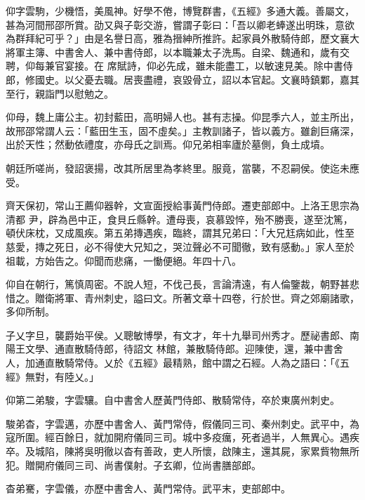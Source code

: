 \begin{pinyinscope}
 仰字雲駒，少機悟，美風神。好學不倦，博覽群書，《五經》多通大義。善屬文，甚為河間邢邵所賞。劭又與子彰交游，嘗謂子彰曰：「吾以卿老蜯遂出明珠，意欲為群拜紀可乎？」由是名譽日高，雅為搢紳所推許。起家員外散騎侍郎，歷文襄大將軍主簿、中書舍人、兼中書侍郎，以本職兼太子洗馬。自梁、魏通和，歲有交聘，仰每兼官宴接。在
 席賦詩，仰必先成，雖未能盡工，以敏速見美。除中書侍郎，修國史。以父憂去職。居喪盡禮，哀毀骨立，詔以本官起。文襄時鎮鄴，嘉其至行，親詣門以慰勉之。



 仰母，魏上庸公主。初封藍田，高明婦人也。甚有志操。仰昆季六人，並主所出，故邢邵常謂人云：「藍田生玉，固不虛矣。」主教訓諸子，皆以義方。雖創巨痛深，出於天性；然動依禮度，亦母氏之訓焉。仰兄弟相率廬於墓側，負土成墳。



 朝廷所嗟尚，發詔褒揚，改其所居里為孝終里。服竟，當襲，不忍嗣侯。使迄未應受。



 齊天保初，常山王薦仰器幹，文宣面授給事黃門侍郎。遷吏部郎中。上洛王思宗為清都
 尹，辟為邑中正，食貝丘縣幹。遭母喪，哀慕毀悴，殆不勝喪，遂至沈篤，頓伏床枕，又成風疾。第五弟摶遇疾，臨終，謂其兄弟曰：「大兄尪病如此，性至慈愛，摶之死日，必不得使大兄知之，哭泣聲必不可聞徹，致有感動。」家人至於祖載，方始告之。仰聞而悲痛，一慟便絕。年四十八。



 仰自在朝行，篤慎周密。不說人短，不伐己長，言論清遠，有人倫鑒裁，朝野甚悲惜之。贈衛將軍、青州刺史，謚曰文。所著文章十四卷，行於世。齊之郊廟諸歌，多仰所制。



 子乂字旦，襲爵始平侯。乂聰敏博學，有文才，年十九舉司州秀才。歷祕書郎、南陽王文學、通直散騎侍郎，待詔文
 林館，兼散騎侍郎。迎陳使，還，兼中書舍人，加通直散騎常侍。乂於《五經》最精熟，館中謂之石經。人為之語曰：「《五經》無對，有陸乂。」



 仰第二弟駿，字雲驤。自中書舍人歷黃門侍郎、散騎常侍，卒於東廣州刺史。



 駿弟杳，字雲邁，亦歷中書舍人、黃門常侍，假儀同三司、秦州刺史。武平中，為寇所圍。經百餘日，就加開府儀同三司。城中多疫癘，死者過半，人無異心。遇疾卒。及城陷，陳將吳明徹以杳有善政，吏人所懷，啟陳主，還其屍，家累貲物無所犯。贈開府儀同三司、尚書僕射。子玄卿，位尚書膳部郎。



 杳弟騫，字雲儀，亦歷中書舍人、黃門常侍。武平末，吏部郎中。




\end{pinyinscope}
